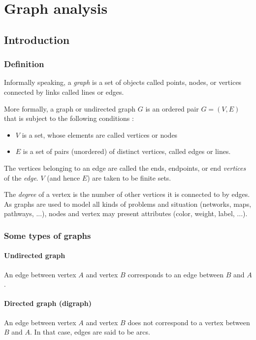 \chapter{Graph analysis}


\section{Introduction}
\subsection{Definition}
Informally speaking, a \textit{graph} is a set of objects called points, nodes, or vertices connected by links called lines or edges. 

More formally, a graph or undirected graph $G$ is an ordered pair $G = (V,E)$ that is subject to the following conditions :

\begin{itemize}
\item $V$ is a set, whose elements are called vertices or nodes
\item $E$ is a set of pairs (unordered) of distinct vertices, called edges or lines.
\end{itemize}


The vertices belonging to an edge are called the ends, endpoints, or end \textit{vertices} of the \textit{edge}. $V$ (and hence $E$) are taken to be finite sets.

The \textit{degree} of a vertex is the number of other vertices it is connected to by edges.
As graphs are used to model all kinds of problems and situation (networks, maps, pathways, ...), nodes and vertex may present attributes (color, weight, label, ...).

\subsection{Some types of graphs}
\subsubsection{Undirected graph}
An edge between vertex $A$ and vertex $B$ corresponds to an edge between $B$ and $A$.
\subsubsection{Directed graph (digraph)}
An edge between vertex $A$ and vertex $B$ does not correspond to a vertex between $B$ and $A$. In that case, edges are said to be arcs.
